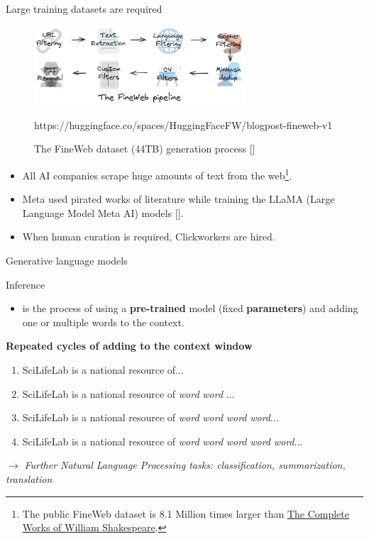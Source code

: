 \documentclass[10pt]{beamer}
\newcommand{\credit}[1]{{\par \raggedleft \scriptsize \mdseries \color{mDarkBrown} #1 \par}}
\newcommand{\citeme}[1]{{\xspace\color{scAqua} \scriptsize [\cite{#1}]}}
\newcommand{\feature}[1]{{\color{scLime} \textbf{#1}}}
\newcommand{\remark}[1]{{\par \color{scGrape} \ensuremath{\rightarrow} \emph{#1}}}
\begin{document}
\begin{frame}{Large training datasets are required}
	\begin{figure}
		\includegraphics[width=0.7\textwidth]{figures/dist_assets_images_fineweb-recipe.png}
		\caption{The FineWeb dataset (44TB) generation process\citeme{Penedo2024}}
		\credit{https://huggingface.co/spaces/HuggingFaceFW/blogpost-fineweb-v1}
	\end{figure}
	\begin{itemize}
		\item All AI companies scrape huge amounts of text from the web\footnote{The public FineWeb dataset is 8.1 Million times larger than \href{https://www.gutenberg.org/ebooks/100}{The Complete Works of William Shakespeare}.}.
		\item Meta used pirated works of literature while training the LLaMA (Large Language Model Meta AI) models\citeme{Belanger2025}.
		\item When human curation is required, Clickworkers are hired.\par
	\end{itemize}
\end{frame}

\begin{frame}{Generative language models}
	\begin{exampleblock}{Inference}
		\begin{itemize}
			\item is the process of using a \feature{pre-trained} model (fixed \feature{parameters}) and adding one or multiple words to the context.
		\end{itemize}
	\end{exampleblock}
	\textbf{Repeated cycles of adding to the \feature{context window}}
	\begin{enumerate}
		\item SciLifeLab is a national resource of...
		\item SciLifeLab is a national resource of \emph{word} \emph{word} ...
		\item SciLifeLab is a national resource of \emph{word} \emph{word} \emph{word} \emph{word}...
		\item SciLifeLab is a national resource of \emph{word} \emph{word} \emph{word} \emph{word} \emph{word}...
	\end{enumerate}
\remark{Further Natural Language Processing tasks: classification, summarization, translation}
\end{frame}
\end{document}
